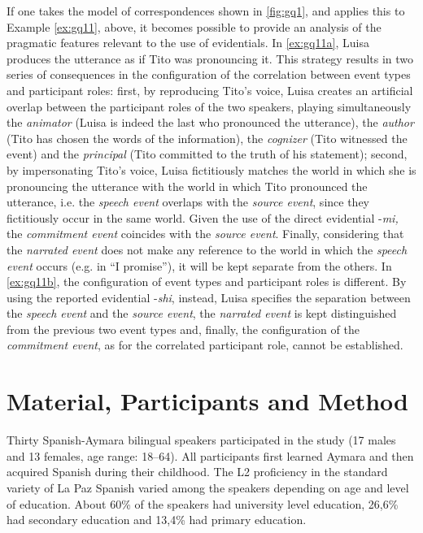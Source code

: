 \documentclass[output=paper]{langsci/langscibook}
\begin{document}
If one takes the model of correspondences shown in \ref{fig:gq1}, and applies this to Example \ref{ex:gq11}, above, it becomes possible to provide an analysis of the pragmatic features relevant to the use of evidentials. In \ref{ex:gq11a}, Luisa produces the utterance as if Tito was pronouncing it. This strategy results in two series of consequences in the configuration of the correlation between event types and participant roles: first, by reproducing Tito’s voice, Luisa creates an artificial overlap between the participant roles of the two speakers, playing simultaneously the \textit{animator} (Luisa is indeed the last who pronounced the utterance), the \textit{author} (Tito has chosen the words of the information), the \textit{cognizer} (Tito witnessed the event) and the \textit{principal} (Tito committed to the truth of his statement); second, by impersonating Tito’s voice, Luisa fictitiously matches the world in which she is pronouncing the utterance with the world in which Tito pronounced the utterance, i.e. the \textit{speech event} overlaps with the \textit{source event}, since they fictitiously occur in the same world. Given the use of the direct evidential -\textit{mi,} the \textit{commitment event} coincides with the \textit{source event}. Finally, considering that the \textit{narrated event} does not make any reference to the world in which the \textit{speech event} occurs (e.g. in “I promise”), it will be kept separate from the others. In \ref{ex:gq11b}, the configuration of event types and participant roles is different. By using the reported evidential -\textit{shi}, instead, Luisa specifies the separation between the \textit{speech event} and the \textit{source event}, the \textit{narrated event} is kept distinguished from the previous two event types and, finally, the configuration of the \textit{commitment event}, as for the correlated participant role, cannot be established. 

\section{Material, Participants and Method}\label{s:gq3}

Thirty Spanish-Aymara bilingual speakers participated in the study (17 males and 13 females, age range: 18--64). All participants first learned Aymara and then acquired Spanish during their childhood. The L2 proficiency in the standard variety of La Paz Spanish varied among the speakers depending on age and level of education. About 60\% of the speakers had university level education, 26,6\% had secondary education and 13,4\% had primary education. 
\end{document}
